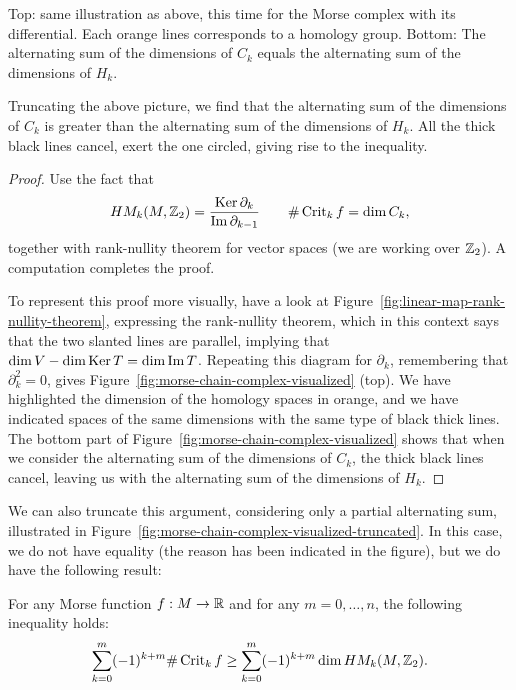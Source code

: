 \begin{marginfigure}
    \centering
    \caption{
        Top: same illustration as above, this time for the Morse complex with its differential.
        Each orange lines corresponds to a homology group.
        Bottom: The alternating sum of the dimensions of $C_k$ equals the alternating sum of the dimensions of $H_k$.
    }
    \label{fig:morse-chain-complex-visualized}
\end{marginfigure}
\begin{marginfigure}
    \centering
    \caption{Truncating the above picture, we find that the alternating sum of the dimensions of $C_k$ is greater than the alternating sum of the dimensions of  $H_k$. All the thick black lines cancel, exert the one circled, giving rise to the inequality.
    }
    \label{fig:morse-chain-complex-visualized-truncated}
\end{marginfigure}
\begin{proof}
    Use the fact that 
    \[
        \HMf[k]{M, \Z_2} = \frac{\Ker \partial_k}{\Im \partial_{k-1}} \qquad \# \Crit_k f = \dim C_k,
    \]
    together with rank-nullity theorem for vector spaces (we are working over $\Z_2$). A computation completes the proof.

    To represent this proof more visually, have a look at Figure~\ref{fig:linear-map-rank-nullity-theorem}, expressing the rank-nullity theorem, which in this context says that the two slanted lines are parallel, implying that $\dim V - \dim \Ker T = \dim \Im T$.
    Repeating this diagram for $\partial_k$, remembering that  $\partial_k^2 = 0$, gives Figure~\ref{fig:morse-chain-complex-visualized} (top). We have highlighted the dimension of the homology spaces in orange, and we have indicated spaces of the same dimensions with the same type of black thick lines.
    The bottom part of Figure~\ref{fig:morse-chain-complex-visualized} shows that when we consider the alternating sum of the dimensions of $C_k$, the thick black lines cancel, leaving us with the alternating sum of the dimensions of $H_k$.
    \end{proof}

    We can also truncate this argument, considering only a partial alternating sum, illustrated in Figure~\ref{fig:morse-chain-complex-visualized-truncated}.
    In this case, we do not have equality (the reason has been indicated in the figure), but we do have the following result:
\begin{theorem}
    For any Morse function $f: M \to  \R$ and for any $m = 0, \ldots, n$, the following inequality holds:
    \[
        \sum_{k=0}^{m} (-1)^{k+m} \# \Crit_k f \ge  \sum_{k=0}^{m} (-1)^{k+m} \dim \HMf[k]{M, \Z_2}
    .\] 
\end{theorem}

